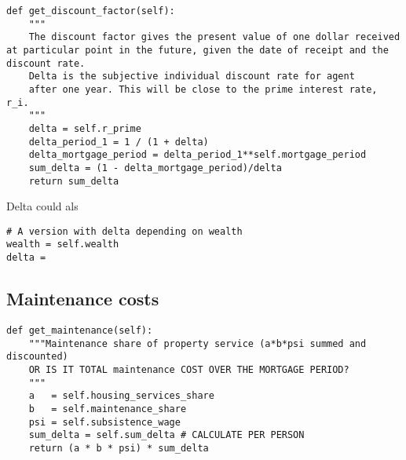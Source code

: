     
\begin{lstlisting}
def get_discount_factor(self):
    """
    The discount factor gives the present value of one dollar received at particular point in the future, given the date of receipt and the discount rate.
    Delta is the subjective individual discount rate for agent
    after one year. This will be close to the prime interest rate, r_i.
    """    
    delta = self.r_prime
    delta_period_1 = 1 / (1 + delta) 
    delta_mortgage_period = delta_period_1**self.mortgage_period
    sum_delta = (1 - delta_mortgage_period)/delta
    return sum_delta
\end{lstlisting}
Delta could als%


\begin{lstlisting}
# A version with delta depending on wealth
wealth = self.wealth
delta =
\end{lstlisting}

\subsection{Maintenance costs}
\begin{lstlisting}
def get_maintenance(self):
    """Maintenance share of property service (a*b*psi summed and discounted)
    OR IS IT TOTAL maintenance COST OVER THE MORTGAGE PERIOD?
    """
    a   = self.housing_services_share
    b   = self.maintenance_share
    psi = self.subsistence_wage
    sum_delta = self.sum_delta # CALCULATE PER PERSON
    return (a * b * psi) * sum_delta
\end{lstlisting}

